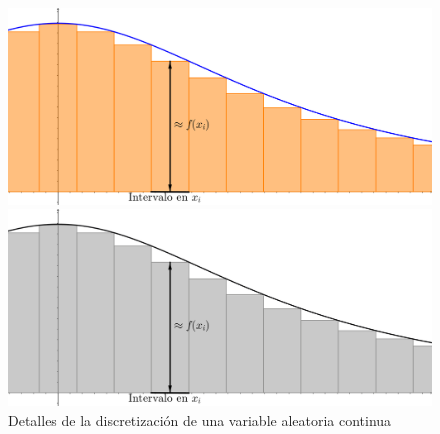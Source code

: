 \begin{figure}[htbp]
\begin{center}
\begin{enColor}
\includegraphics[width=12cm]{../fig/Cap05-Discretizacion-detalle.png}
\end{enColor}
\begin{bn}
\includegraphics[width=12cm]{../fig/Cap05-Discretizacion-detalle-bn.png}
\end{bn}
\caption{Detalles de la discretización de una variable aleatoria continua}
\label{cap05:fig:Discretizacion-detalle}
\end{center}
\end{figure}

